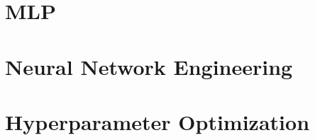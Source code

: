 \documentclass{article}
\begin{document}
\section{MLP}

\newpage

\section{Neural Network Engineering}

\newpage

\section{Hyperparameter Optimization}

\end{document}
